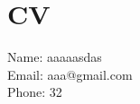 \documentclass{article}
\begin{document}
    \section*{CV}
    Name: aaaaasdas \\
    Email: aaa@gmail.com \\
    Phone: 32
    
\end{document}
